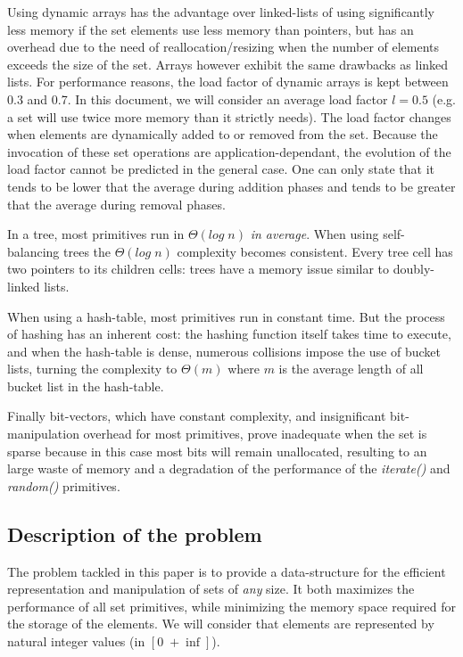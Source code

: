 \documentclass{article}
\newcommand{\complexityvalue}[1]{$\Theta(#1)$}
\newcommand{\prmtv}[1]{\textit{#1()}}
\begin{document}
Using dynamic arrays has the advantage over linked-lists of using significantly
less memory if the set elements use less memory than pointers, but has an overhead due to the need of reallocation/resizing when
the number of elements exceeds the size of the set. Arrays however exhibit the same drawbacks as linked lists.
For performance reasons, the load factor of dynamic arrays
is kept between 0.3 and 0.7. In this document, we will consider an average load factor $l = 0.5$ (e.g. a set will use twice more memory than it strictly needs).
The load factor changes when elements are  dynamically added to or removed from the set.
Because the invocation of these set operations are application-dependant, the evolution of the load factor
cannot be predicted in the general case. One can only state that it tends to be lower that the average during addition phases
and tends to be greater that the average during removal phases.


In a tree, most primitives  run in \complexityvalue{log\; n} \textit{in average}. When using self-balancing trees
the \complexityvalue{log\; n} complexity becomes consistent. Every tree
cell has two pointers to its children cells: trees have a memory issue similar
to doubly-linked lists.

When using a hash-table, most primitives run in constant time. But the process
of hashing has an inherent cost: the hashing function itself takes time
to execute, and when the hash-table is dense, numerous collisions impose the use of bucket lists, turning the complexity to  \complexityvalue{m} where $m$ is the average length of all bucket list in the hash-table.

Finally bit-vectors, which have constant complexity, and insignificant bit-manipulation overhead for most primitives, prove inadequate
when the set is sparse because in this case most bits will remain unallocated, resulting to an large waste of memory
and a degradation of the performance of the \prmtv{iterate} and \prmtv{random} primitives.  




\subsection{Description of the problem}


The problem tackled in this paper is to provide a data-structure for the efficient representation and manipulation of
sets of \textit{any} size. It both maximizes the performance of all set primitives, while minimizing
the memory space required for the storage of the elements.
We will consider that elements are represented by natural integer values (in $[0\;+\inf]$).
\end{document}
